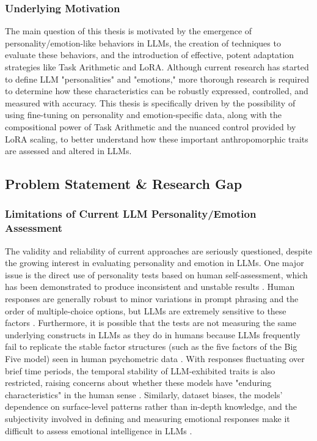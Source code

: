 \documentclass{DESSThesis}
\begin{document}
\subsubsection{Underlying Motivation}
The main question of this thesis is motivated by the emergence of personality/emotion-like behaviors in LLMs, the creation of techniques to evaluate these behaviors, and the introduction of effective, potent adaptation strategies like Task Arithmetic and LoRA. Although current research has started to define LLM "personalities" and "emotions," more thorough research is required to determine how these characteristics can be robustly expressed, controlled, and measured with accuracy. This thesis is specifically driven by the possibility of using fine-tuning on personality and emotion-specific data, along with the compositional power of Task Arithmetic and the nuanced control provided by LoRA scaling, to better understand how these important anthropomorphic traits are assessed and altered in LLMs.

\subsection{Problem Statement \& Research Gap}

\subsubsection{Limitations of Current LLM Personality/Emotion Assessment}
The validity and reliability of current approaches are seriously questioned, despite the growing interest in evaluating personality and emotion in LLMs. One major issue is the direct use of personality tests based on human self-assessment, which has been demonstrated to produce inconsistent and unstable results \cite{gupta_self-assessment_2024,shu_you_2024,suhr_challenging_2023,tommaso_llms_2024}. Human responses are generally robust to minor variations in prompt phrasing and the order of multiple-choice options, but LLMs are extremely sensitive to these factors \cite{gupta_self-assessment_2024,shu_you_2024,zheng_lmlpa_2024}. Furthermore, it is possible that the tests are not measuring the same underlying constructs in LLMs as they do in humans because LLMs frequently fail to replicate the stable factor structures (such as the five factors of the Big Five model) seen in human psychometric data \cite{suhr_challenging_2023}. With responses fluctuating over brief time periods, the temporal stability of LLM-exhibited traits is also restricted, raising concerns about whether these models have "enduring characteristics" in the human sense \cite{bodroza_personality_2024,tommaso_llms_2024}. Similarly, dataset biases, the models' dependence on surface-level patterns rather than in-depth knowledge, and the subjectivity involved in defining and measuring emotional responses make it difficult to assess emotional intelligence in LLMs \cite{sabour_emobench_2024,paech_eq-bench_2024}.
\end{document}
